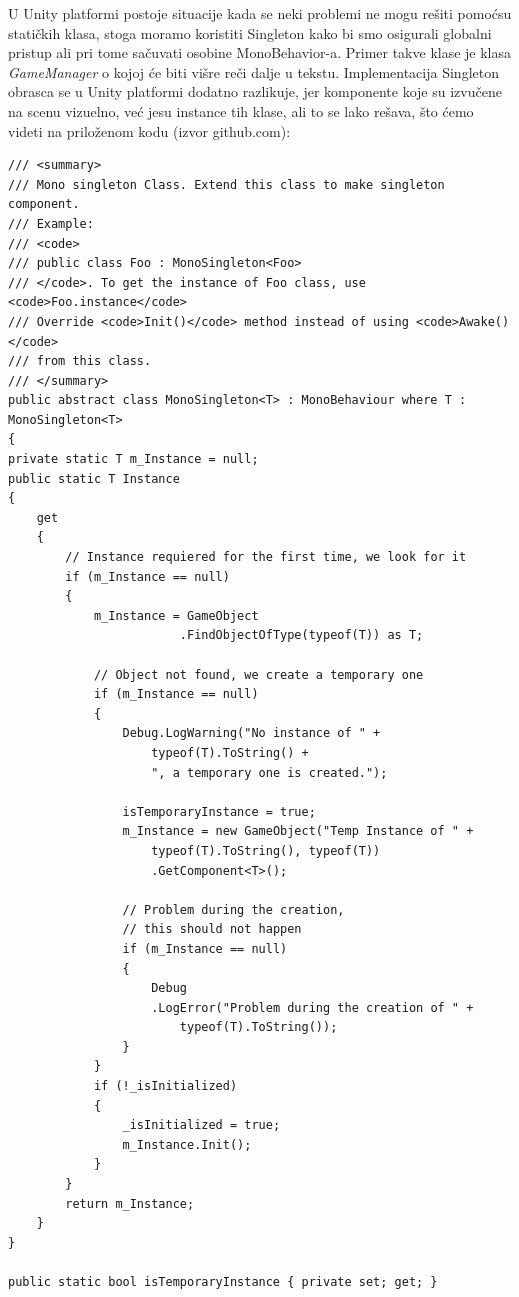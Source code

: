U Unity platformi postoje situacije kada se neki problemi ne mogu re\v{s}iti pomo\'csu stati\v{c}kih klasa, 
stoga moramo koristiti Singleton kako bi smo osigurali globalni pristup ali pri tome sa\v{c}uvati osobine MonoBehavior-a. 
Primer takve klase je klasa \emph{GameManager} o kojoj \'ce biti vi\v{s}re re\v{c}i dalje u tekstu. Implementacija Singleton obrasca se 
u Unity platformi dodatno razlikuje, jer komponente koje su izvu\v{c}ene na scenu vizuelno, ve\'c jesu instance tih klase, ali to se lako re\v{s}ava,
\v{s}to \'cemo videti na prilo\v{z}enom kodu (izvor github.com):

\begin{verbatim}
/// <summary>
/// Mono singleton Class. Extend this class to make singleton component.
/// Example: 
/// <code>
/// public class Foo : MonoSingleton<Foo>
/// </code>. To get the instance of Foo class, use <code>Foo.instance</code>
/// Override <code>Init()</code> method instead of using <code>Awake()</code>
/// from this class.
/// </summary>
public abstract class MonoSingleton<T> : MonoBehaviour where T : MonoSingleton<T>
{
private static T m_Instance = null;
public static T Instance
{
    get
    {
        // Instance requiered for the first time, we look for it
        if (m_Instance == null)
        {
            m_Instance = GameObject
                        .FindObjectOfType(typeof(T)) as T;

            // Object not found, we create a temporary one
            if (m_Instance == null)
            {
                Debug.LogWarning("No instance of " + 
                    typeof(T).ToString() + 
                    ", a temporary one is created.");

                isTemporaryInstance = true;
                m_Instance = new GameObject("Temp Instance of " + 
                    typeof(T).ToString(), typeof(T))
                    .GetComponent<T>();

                // Problem during the creation, 
                // this should not happen
                if (m_Instance == null)
                {
                    Debug
                    .LogError("Problem during the creation of " + 
                        typeof(T).ToString());
                }
            }
            if (!_isInitialized)
            {
                _isInitialized = true;
                m_Instance.Init();
            }
        }
        return m_Instance;
    }
}

public static bool isTemporaryInstance { private set; get; }


\end{verbatim}
